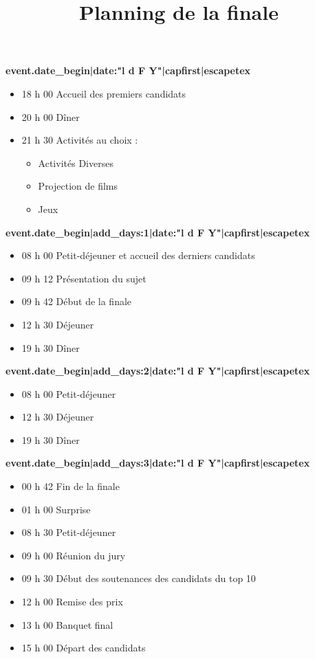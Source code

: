 \documentclass[a4paper,11pt]{prologin}
\title{Planning de la finale}
\begin{document}
\textbf{ {{ event.date_begin|date:"l d F Y"|capfirst|escapetex }} }

\begin{itemize}
    \item 18 h 00                 Accueil des premiers candidats
    \item 20 h 00                 Dîner
    \item 21 h 30                 Activités au choix :
    \begin{itemize}
	\item[~]            Activités Diverses
	\item[~]            Projection de films
	\item[~]            Jeux
    \end{itemize}
\end{itemize}

\vspace{0.3cm}
\textbf{ {{ event.date_begin|add_days:1|date:"l d F Y"|capfirst|escapetex }} }

\begin{itemize}
    \item 08 h 00                 Petit-déjeuner et accueil des derniers candidats
    \item 09 h 12                 Présentation du sujet
    \item 09 h 42                 Début de la finale
    \item 12 h 30                 Déjeuner
    \item 19 h 30                 Dîner
\end{itemize}

\vspace{0.3cm}
\textbf{ {{ event.date_begin|add_days:2|date:"l d F Y"|capfirst|escapetex }} }

\begin{itemize}
    \item 08 h 00                 Petit-déjeuner
    \item 12 h 30                 Déjeuner
    \item 19 h 30                 Dîner
\end{itemize}

\vspace{0.3cm}
\textbf{ {{ event.date_begin|add_days:3|date:"l d F Y"|capfirst|escapetex }} }

\begin{itemize}
    \item 00 h 42                 Fin de la finale
    \item 01 h 00                 Surprise
    \item 08 h 30                 Petit-déjeuner
    \item 09 h 00                 Réunion du jury
    \item 09 h 30                 Début des soutenances des candidats du top 10
    \item 12 h 00                 Remise des prix
    \item 13 h 00                 Banquet final
    \item 15 h 00                 Départ des candidats
\end{itemize}
\end{document}
